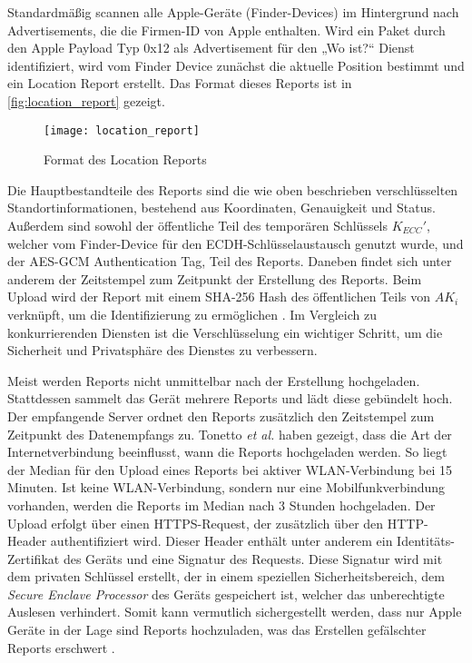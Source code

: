 Standardmäßig scannen alle Apple-Geräte (Finder-Devices) im Hintergrund nach Advertisements, die die Firmen-ID von Apple enthalten.
Wird ein Paket durch den Apple Payload Typ 0x12 als Advertisement für den „Wo ist?“ Dienst identifiziert, wird vom Finder Device zunächst die aktuelle Position bestimmt und ein Location Report erstellt.
Das Format dieses Reports ist in \autoref{fig:location_report} gezeigt.
\begin{figure}
    \centering
    \texttt{[image: location\_report]}
    \caption{Format des Location Reports \cite{Heinrich_FindMy}}
    \label{fig:location_report}
\end{figure}
Die Hauptbestandteile des Reports sind die wie oben beschrieben verschlüsselten Standortinformationen, bestehend aus Koordinaten, Genauigkeit und Status.
Außerdem sind sowohl der öffentliche Teil des temporären Schlüssels $K_{ECC}'$, welcher vom Finder-Device für den \ac{ECDH}-Schlüsselaustausch genutzt wurde, und der \ac{AES}-\ac{GCM} Authentication Tag, Teil des Reports.
Daneben findet sich unter anderem der Zeitstempel zum Zeitpunkt der Erstellung des Reports.
Beim Upload wird der Report mit einem \ac{SHA}-256 Hash des öffentlichen Teils von $AK_i$ verknüpft, um die Identifizierung zu ermöglichen \cite{Heinrich_FindMy}.
Im Vergleich zu konkurrierenden Diensten ist die Verschlüsselung ein wichtiger Schritt, um die Sicherheit und Privatsphäre des Dienstes zu verbessern.


Meist werden Reports nicht unmittelbar nach der Erstellung hochgeladen.
Stattdessen sammelt das Gerät mehrere Reports und lädt diese gebündelt hoch.
Der empfangende Server ordnet den Reports zusätzlich den Zeitstempel zum Zeitpunkt des Datenempfangs zu.
Tonetto \textit{et al.} \cite{Tonetto_FindMy} haben gezeigt, dass die Art der Internetverbindung beeinflusst, wann die Reports hochgeladen werden.
So liegt der Median für den Upload eines Reports bei aktiver WLAN-Verbindung bei 15 Minuten.
Ist keine WLAN-Verbindung, sondern nur eine Mobilfunkverbindung vorhanden, werden die Reports im Median nach 3 Stunden hochgeladen.
Der Upload erfolgt über einen HTTPS-Request, der zusätzlich über den HTTP-Header authentifiziert wird.
Dieser Header enthält unter anderem ein Identitäts-Zertifikat des Geräts und eine Signatur des Requests.
Diese Signatur wird mit dem privaten Schlüssel erstellt, der in einem speziellen Sicherheitsbereich, dem \textit{Secure Enclave Processor} des Geräts gespeichert ist, welcher das unberechtigte Auslesen verhindert.
Somit kann vermutlich sichergestellt werden, dass nur Apple Geräte in der Lage sind Reports hochzuladen, was das Erstellen gefälschter Reports erschwert \cite{Heinrich_FindMy}.


